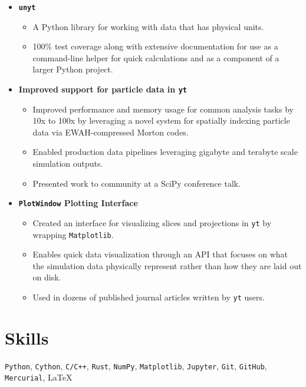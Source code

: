 \documentclass[10pt,letterpaper]{article}
\begin{document}
\begin{itemize}

  \item[] {\bf \texttt{unyt}}
    \begin{itemize}
      \item A Python library for working with data that has physical
        units.
      \item 100\% test coverage along with extensive documentation for use as a
        command-line helper for quick calculations and as a component of a
        larger Python project.
    \end{itemize}
  \item[] {\bf Improved support for particle data in \texttt{yt}}
    \begin{itemize}
      \item Improved performance and memory usage for common analysis tasks by
        10x to 100x by leveraging a novel system for spatially indexing particle
        data via EWAH-compressed Morton codes.
      \item Enabled production data pipelines leveraging gigabyte and
        terabyte scale simulation outputs.
      \item Presented work to community at a SciPy conference talk.
    \end{itemize}
  \item[] {\bf\texttt{PlotWindow} Plotting Interface}
    \begin{itemize}
      \item Created an interface for visualizing slices and projections in
        \texttt{yt} by wrapping \texttt{Matplotlib}.
      \item Enables quick data visualization through an API that
        focuses on what the simulation data physically represent rather than how
        they are laid out on disk.
      \item Used in dozens of published journal articles
        written by \texttt{yt} users.
    \end{itemize}

\end{itemize}

\section*{Skills}

\texttt{Python}, \texttt{Cython}, \texttt{C/C++}, \texttt{Rust}, \texttt{NumPy}, \texttt{Matplotlib},
\texttt{Jupyter}, \texttt{Git}, \texttt{GitHub}, \texttt{Mercurial}, \LaTeX\
\end{document}
